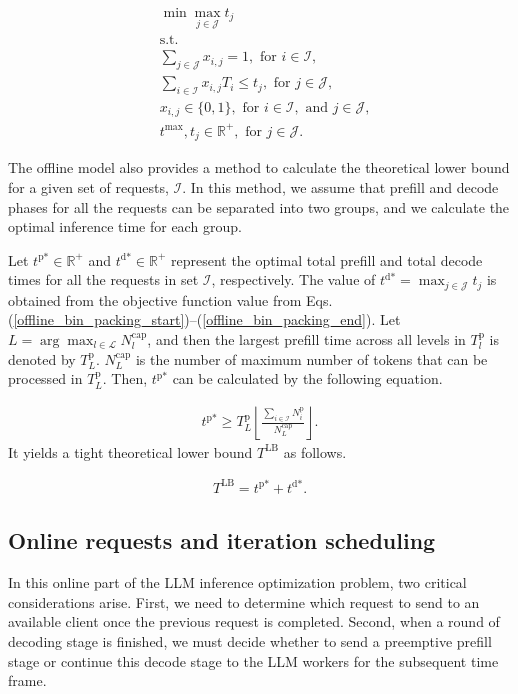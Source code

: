 \begin{align}
    \label{offline_bin_packing_start}
    & \min \max_{j\in \mathcal{J}} t_j \\
    & \nonumber \text{s.t.} \\
    & \sum_{j \in \mathcal{J}} x_{i,j} = 1, \text{ for } i\in \mathcal{I}, \\
    & \sum_{i\in \mathcal{I}} x_{i,j} T_i \leq t_j, \text{ for } j\in \mathcal{J}, \\    
    & x_{i,j} \in \{0,1\}, \text{ for } i\in \mathcal{I},\text{ and }j\in \mathcal{J},\\
    \label{offline_bin_packing_end}
    & t^\text{max}, t_j \in \mathbb{R}^+, \text{ for } j \in  \mathcal{J}.
\end{align}

The offline model also provides a method to calculate the theoretical lower bound for a given set of requests, $\mathcal{I}$. In this method, we assume that prefill and decode phases for all the requests can be separated into two groups, and we calculate the optimal inference time for each group.

Let $t^{\text{p}*} \in \mathbb{R}^+$ and $t^{\text{d}*} \in \mathbb{R}^+$ represent the optimal total prefill and total decode times for all the requests in set $\mathcal{I}$, respectively. The value of $t^{\text{d}*}=\max_{j\in \mathcal{J}} t_j$ is obtained from the objective function value from Eqs. (\ref{offline_bin_packing_start})--(\ref{offline_bin_packing_end}). Let $L=\arg\max_{l \in \mathcal{L}} N_l^{\text{cap}}$, and then the largest prefill time across all levels in $T^\text{p}_l$ is denoted by $T^\text{p}_L$. $N^{\text{cap}}_L$ is the number of maximum number of tokens that can be processed in $T^\text{p}_L$. Then, $t^{\text{p}*}$ can be calculated by the following equation. 

\begin{align}
t^{\text{p}*} \geq T^\text{p}_L  \left\lfloor \frac{\sum_{i\in \mathcal{I}} N_i^{\text{p}}}{N^{\text{cap}}_L} \right\rfloor.
\end{align}
It yields a tight theoretical lower bound $T^{\text{LB}}$ as follows.

\begin{align}
\label{theoreticalLB}
T^{\text{LB}} = t^{\text{p}*} + t^{\text{d}*}.
\end{align}

\subsection{Online requests and iteration scheduling}
In this online part of the LLM inference optimization problem, two critical considerations arise. First, we need to determine which request to send to an available client once the previous request is completed. Second, when a round of decoding stage is finished, we must decide whether to send a preemptive prefill stage or continue this decode stage to the LLM workers for the subsequent time frame.

